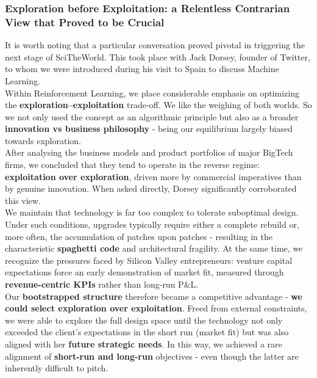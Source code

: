 \documentclass{article}
\begin{document}
\subsubsection{Exploration before Exploitation: a Relentless Contrarian View that Proved to be Crucial}
\label{subsubsection: Exploration before Exploitation: a Relentless Contrarian View that Proved to be Crucial}

It is worth noting that a particular conversation proved pivotal in triggering the next stage of SciTheWorld. This took place with Jack Dorsey, founder of Twitter, to whom we were introduced during his visit to Spain to discuss Machine Learning.\\

Within Reinforcement Learning, we place considerable emphasis on optimizing the \textbf{exploration–exploitation} trade-off. We like the weighing of both worlds. So we not only used the concept as an algorithmic principle but also as a broader \textbf{innovation vs business philosophy} - being our equilibrium largely biased towards exploration.\\

After analysing the business models and product portfolios of major BigTech firms, we concluded that they tend to operate in the reverse regime: \textbf{exploitation over exploration}, driven more by commercial imperatives than by genuine innovation. When asked directly, Dorsey significantly corroborated this view.\\

We maintain that technology is far too complex to tolerate suboptimal design. Under such conditions, upgrades typically require either a complete rebuild or, more often, the accumulation of patches upon patches - resulting in the characteristic \textbf{spaghetti code} and architectural fragility. At the same time, we recognize the pressures faced by Silicon Valley entrepreneurs: venture capital expectations force an early demonstration of market fit, measured through \textbf{revenue-centric KPIs} rather than long-run P\&L.\\

Our \textbf{bootstrapped structure} therefore became a competitive advantage - \textbf{we could select exploration over exploitation}. Freed from external constraints, we were able to explore the full design space until the technology not only exceeded the client’s expectations in the short run (market fit) but was also aligned with her \textbf{future strategic needs}. In this way, we achieved a rare alignment of \textbf{short-run and long-run} objectives - even though the latter are inherently difficult to pitch.\\
\end{document}
